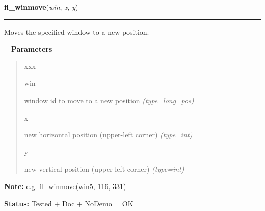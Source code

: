 \hspace{.8\funcindent}\begin{boxedminipage}{\funcwidth}

    \raggedright \textbf{fl\_winmove}(\textit{win}, \textit{x}, \textit{y})

    \vspace{-1.5ex}

    \rule{\textwidth}{0.5\fboxrule}
\setlength{\parskip}{2ex}

Moves the specified window to a new position.

-{}-
\setlength{\parskip}{1ex}
      \textbf{Parameters}
      \vspace{-1ex}

      \begin{quote}
        \begin{Ventry}{xxx}

          \item[win]


window id to move to a new position
            {\it (type=long\_pos)}

          \item[x]


new horizontal position (upper-left corner)
            {\it (type=int)}

          \item[y]


new vertical position (upper-left corner)
            {\it (type=int)}

        \end{Ventry}

      \end{quote}

\textbf{Note:} 
e.g. fl\_winmove(win5, 116, 331)


\textbf{Status:} 
Tested + Doc + NoDemo = OK


    \end{boxedminipage}

    \label{xformslib:flxbasic:fl_winreshape}

    \vspace{0.5ex}

